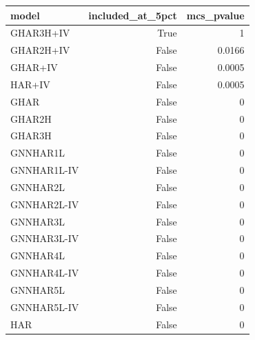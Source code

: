 \begin{tabular}{lrr}
\toprule
model & included_at_5pct & mcs_pvalue \\
\midrule
GHAR3H+IV & True & 1 \\
GHAR2H+IV & False & 0.0166 \\
GHAR+IV & False & 0.0005 \\
HAR+IV & False & 0.0005 \\
GHAR & False & 0 \\
GHAR2H & False & 0 \\
GHAR3H & False & 0 \\
GNNHAR1L & False & 0 \\
GNNHAR1L-IV & False & 0 \\
GNNHAR2L & False & 0 \\
GNNHAR2L-IV & False & 0 \\
GNNHAR3L & False & 0 \\
GNNHAR3L-IV & False & 0 \\
GNNHAR4L & False & 0 \\
GNNHAR4L-IV & False & 0 \\
GNNHAR5L & False & 0 \\
GNNHAR5L-IV & False & 0 \\
HAR & False & 0 \\
\bottomrule
\end{tabular}
